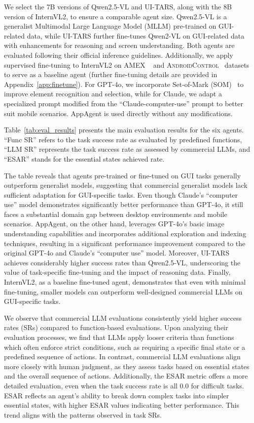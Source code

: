 \documentclass[11pt]{article}
\begin{document}
We select the 7B versions of Qwen2.5-VL and UI-TARS, along with the 8B version of InternVL2, to ensure a comparable agent size. Qwen2.5-VL is a generalist Multimodal Large Language Model (MLLM) pre-trained on GUI-related data, while UI-TARS further fine-tunes Qwen2-VL on GUI-related data with enhancements for reasoning and screen understanding. Both agents are evaluated following their official inference guidelines. Additionally, we apply supervised fine-tuning to InternVL2 on AMEX ~\citep{chai2024amex} and \textsc{AndroidControl}~\citep{li2024androidcontrol} datasets to serve as a baseline agent (further fine-tuning details are provided in Appendix~\ref{app:finetune}). For GPT-4o, we incorporate Set-of-Mark (SOM)~\citep{yang2023set} to improve element recognition and selection, while for Claude, we adapt a specialized prompt modified from the ``Claude-computer-use'' prompt to better suit mobile scenarios. AppAgent is used directly without any modifications.

Table~\ref{tab:eval_results} presents the main evaluation results for the six agents. ``Func SR'' refers to the task success rate as evaluated by predefined functions, ``LLM SR'' represents the task success rate as assessed by commercial LLMs, and ``ESAR'' stands for the essential states achieved rate.

The table reveals that agents pre-trained or fine-tuned on GUI tasks generally outperform generalist models, suggesting that commercial generalist models lack sufficient adaptation for GUI-specific tasks. Even though Claude’s ``computer use'' model demonstrates significantly better performance than GPT-4o, it still faces a substantial domain gap between desktop environments and mobile scenarios. AppAgent, on the other hand, leverages GPT-4o’s basic image understanding capabilities and incorporates additional exploration and indexing techniques, resulting in a significant performance improvement compared to the original GPT-4o and Claude’s ``computer use'' model. Moreover, UI-TARS achieves considerably higher success rates than Qwen2.5-VL, underscoring the value of task-specific fine-tuning and the impact of reasoning data. Finally, InternVL2, as a baseline fine-tuned agent, demonstrates that even with minimal fine-tuning, smaller models can outperform well-designed commercial LLMs on GUI-specific tasks.

We observe that commercial LLM evaluations consistently yield higher success rates (SRs) compared to function-based evaluations. Upon analyzing their evaluation processes, we find that LLMs apply looser criteria than functions which often enforce strict conditions, such as requiring a specific final state or a predefined sequence of actions. In contrast, commercial LLM evaluations align more closely with human judgment, as they assess tasks based on essential states and the overall sequence of actions. Additionally, the ESAR metric offers a more detailed evaluation, even when the task success rate is all 0.0 for difficult tasks. ESAR reflects an agent's ability to break down complex tasks into simpler essential states, with higher ESAR values indicating better performance. This trend aligns with the patterns observed in task SRs.
\end{document}

